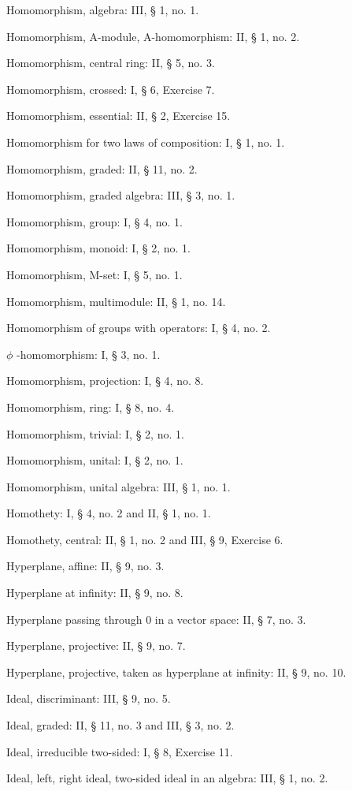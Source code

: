 Homomorphism, algebra: III, § 1, no. 1.

Homomorphism, A-module, A-homomorphism: II, § 1, no. 2.

Homomorphism, central ring: II, § 5, no. 3.

Homomorphism, crossed: I, § 6, Exercise 7.

Homomorphism, essential: II, § 2, Exercise 15.

Homomorphism for two laws of composition: I, § 1, no. 1.

Homomorphism, graded: II, § 11, no. 2.

Homomorphism, graded algebra: III, § 3, no. 1.

Homomorphism, group: I, § 4, no. 1.

Homomorphism, monoid: I, § 2, no. 1.

Homomorphism, M-set: I, § 5, no. 1.

Homomorphism, multimodule: II, § 1, no. 14.

Homomorphism of groups with operators: I, § 4, no. 2.

\(\phi\) -homomorphism: I, § 3, no. 1.

Homomorphism, projection: I, § 4, no. 8.

Homomorphism, ring: I, § 8, no. 4.

Homomorphism, trivial: I, § 2, no. 1.

Homomorphism, unital: I, § 2, no. 1.

Homomorphism, unital algebra: III, § 1, no. 1.

Homothety: I, § 4, no. 2 and II, § 1, no. 1.

Homothety, central: II, § 1, no. 2 and III, § 9, Exercise 6.

Hyperplane, affine: II, § 9, no. 3.

Hyperplane at infinity: II, § 9, no. 8.

Hyperplane passing through 0 in a vector space: II, § 7, no. 3.

Hyperplane, projective: II, § 9, no. 7.

Hyperplane, projective, taken as hyperplane at infinity: II, § 9, no. 10.

Ideal, discriminant: III, § 9, no. 5.

Ideal, graded: II, § 11, no. 3 and III, § 3, no. 2.

Ideal, irreducible two-sided: I, § 8, Exercise 11.

Ideal, left, right ideal, two-sided ideal in an algebra: III, § 1, no. 2.

